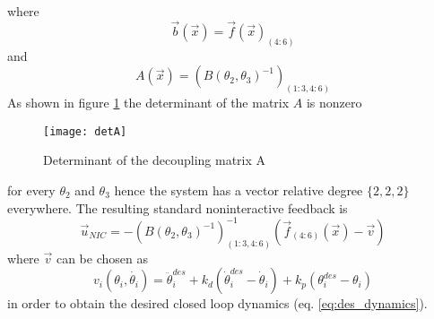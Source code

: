 where
\[
\vec{b}(\vec{x}) = \vec{f}(\vec{x})_{(4:6)}
\]
and
\[
A(\vec{x}) = \left(B(\theta_2,\theta_3) ^ {-1}\right)_{(1:3, 4:6)}
\]
As shown in figure \ref{fig:detA} the determinant of the matrix $A$ is nonzero
\begin{figure}[h]
  \centering
  \texttt{[image: detA]}
  \caption{Determinant of the decoupling matrix A \label{fig:detA}}
\end{figure}
for every $\theta_2$ and $\theta_3$ hence the system has a vector
relative degree $\{2,2,2\}$ everywhere. The resulting standard noninteractive feedback
is
\[
\vec{u}_{NIC} = -\left(B(\theta_2,\theta_3) ^ {-1}\right)_{(1:3, 4:6)}^{-1}
(\vec{f}_{(4:6)}(\vec{x}) - \vec{v} )
\]
where $\vec{v}$ can be chosen as
\begin{equation}\label{eq:PD}
v_i(\theta_i, \dot{\theta_i}) = \ddot{\theta}^{des}_{i} + k_d (\dot{\theta}^{des}_{i} - \dot{\theta}_{i}) + k_p (\theta^{des}_{i} - \theta_{i})
\end{equation}
in order to obtain the desired closed loop dynamics (eq. \ref{eq:des_dynamics}).
